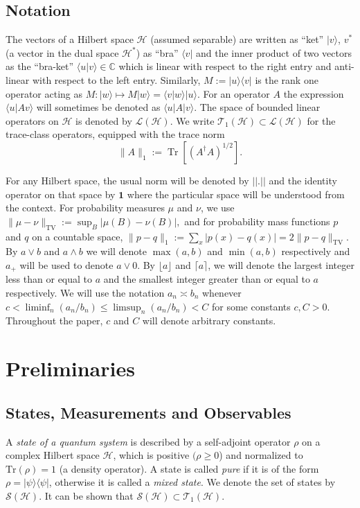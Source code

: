 \documentclass{article}
\theoremstyle{named}
\theoremstyle{named1}
\newcommand{\Tr}{\operatorname{Tr}}
\theoremstyle{plain}
\theoremstyle{remark}
\begin{document}
\subsection{Notation}
 The vectors of a Hilbert
space $\mathcal{H}$ (assumed separable) are written as ``ket'' $|v\rangle$, $v^*$ (a vector in the dual space $\mathcal{H}^*$) as ``bra'' $\langle v|$ and the
inner product of two vectors as the ``bra-ket'' $\langle u|v\rangle\in
\mathbb{C}$ which is linear with respect to the right entry and anti-linear
with respect to the left entry. Similarly, $M:=|u\rangle\langle v| $ is the
rank one operator acting as $M  : |w\rangle \mapsto M|w \rangle = \langle
v |w\rangle |u\rangle$.  For an operator $A$ the expression $\langle u|Av\rangle$ will sometimes be denoted as $\langle u|A|v\rangle$. The space of
bounded linear operators on $\mathcal{H}$ is denoted by $\mathcal{L}(\mathcal{H})$. We write $\mathcal T_1(\mathcal H)\subset\mathcal L(\mathcal H)$ for
the trace-class operators, equipped with the trace norm
\[
\|A\|_1:=\Tr\!\left[(A^\dagger A)^{1/2}\right].
\]



For any Hilbert space, the usual norm will be denoted by $||.||$ and the identity operator on that space by $\mathbf{1}$ where the particular space will be understood from the context. For probability measures $\mu$ and $\nu$, we use
$ \|\mu-\nu\|_{\mathrm{TV}}
    :=
    \sup_B |\mu(B)-\nu(B)|,
$
and for probability mass functions $p$ and $q$ on a countable space,
$\|p-q\|_1
    :=
    \sum_x |p(x)-q(x)|
    =
    2\|p-q\|_{\mathrm{TV}}.$ By $a\vee b$ and $a\wedge b$ we will denote $\max(a,b)$ and $\min(a,b)$ respectively and $a_+$ will be used to denote $a \vee 0$. By $\lfloor a\rfloor$ and $\lceil a \rceil$, we will denote the largest integer less than or equal to $a$ and the smallest integer greater than or equal to $a$ respectively. We will use the notation $a_n\asymp b_n$ whenever $c<\liminf_n (a_n/b_n) \leq \limsup_n (a_n/b_n) <C$ for some constants $c,C>0$. Throughout the paper, $c$ and $C$ will denote arbitrary constants.







\section{Preliminaries}\label{sec:prelim}

\subsection{States, Measurements and Observables}
A \textit{state of a quantum system} is described by a self-adjoint operator
$\rho$ on a complex Hilbert space {$\mathcal{H}$, which is positive }%
$(\rho\geq0$) and normalized to $\mathrm{Tr}\left(  \rho\right)  =1$ (a
density operator). A state is called \textit{pure} if it is of the form $\rho=|\psi\rangle\langle\psi|$, otherwise it is called a \textit{mixed state}. We denote the set of states by $\mathcal{S}(\mathcal{H})$. It can be shown that $\mathcal{S}(\mathcal{H})\subset \mathcal{T}_1(\mathcal{H})$. 
\end{document}
